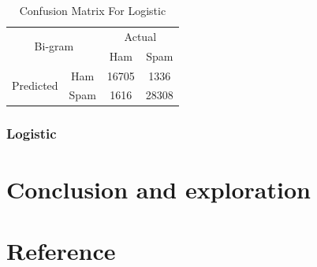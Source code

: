 \documentclass[12pt]{article}
\begin{document}
\begin{table}[H]
\begin{floatrow}
{\begin{subtable}{.5\textwidth}
								\begin{tabular}{@{}|c|c|c|c|@{}}
										\toprule
										\multicolumn{2}{|c|}{\multirow{2}{*}{Bi-gram}} & \multicolumn{2}{c|}{Actual} \\ \cmidrule(l){3-4} 
										\multicolumn{2}{|c|}{}                        & Ham          & Spam         \\ \midrule
										\multirow{2}{*}{Predicted}       & Ham        & 16705        & 1336          \\ \cmidrule(l){2-4} 
										& Spam       & 1616          & 28308        \\ \bottomrule
									\end{tabular}
							\end{subtable}
					}{  
						\caption{Confusion Matrix For Logistic}  
						\label{Confusion_Logistic}  
					}  
			\end{floatrow}
	\end{table} 



\subsubsection{Logistic}



\section{Conclusion and exploration}



\section{Reference}
\end{document}

